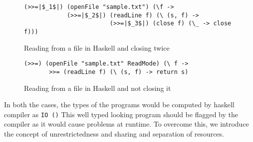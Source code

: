 \begin{figure}[h]
  \begin{framed}
    \begin{verbatim}
(>>=|$_1$|) (openFile "sample.txt") (\f ->
            (>>=|$_2$|) (readLine f) (\ (s, f) ->
                        (>>=|$_3$|) (close f) (\_ -> close f)))
    \end{verbatim}
  \end{framed}
  \caption{Reading from a file in Haskell and closing twice}
  \label{fig:file-read-close-2times-desugared}
\end{figure}

\begin{figure}[h]
  \begin{framed}
\begin{verbatim}
(>>=) (openFile "sample.txt" ReadMode) (\ f ->
       >>= (readLine f) (\ (s, f) -> return s)
\end{verbatim}
  \end{framed}
  \caption{Reading from a file in Haskell and not closing it}
  \label{fig:file-read-noclose-desugared}
\end{figure}

In both the cases, the types of the programs would be computed by haskell compiler as \texttt{IO ()}
This well typed looking program should be flagged by the compiler as it would cause problems at runtime.
To overcome this, we introduce the concept of unrestrictedness and sharing and separation of resources.

